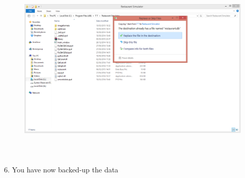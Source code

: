 \begin{figure}[H]
    \includegraphics[height = 9cm]{./Manual/images/restore3} 
    \caption{} \label{fig:hamaerraor3}
\end{figure}

6. You have now backed-up the data

